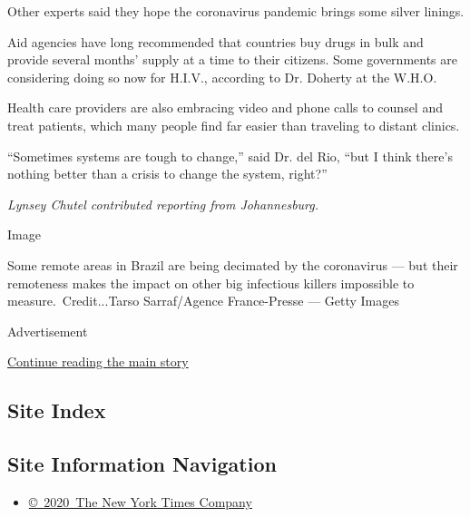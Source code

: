 Other experts said they hope the coronavirus pandemic brings some silver
linings.

Aid agencies have long recommended that countries buy drugs in bulk and
provide several months' supply at a time to their citizens. Some
governments are considering doing so now for H.I.V., according to Dr.
Doherty at the W.H.O.

Health care providers are also embracing video and phone calls to
counsel and treat patients, which many people find far easier than
traveling to distant clinics.

``Sometimes systems are tough to change,'' said Dr. del Rio, ``but I
think there's nothing better than a crisis to change the system,
right?''

\emph{Lynsey Chutel contributed reporting from Johannesburg.}

Image

Some remote areas in Brazil are being decimated by the coronavirus ---
but their remoteness makes the impact on other big infectious killers
impossible to measure.~Credit...Tarso Sarraf/Agence France-Presse ---
Getty Images

Advertisement

\protect\hyperlink{after-bottom}{Continue reading the main story}

\hypertarget{site-index}{%
\subsection{Site Index}\label{site-index}}

\hypertarget{site-information-navigation}{%
\subsection{Site Information
Navigation}\label{site-information-navigation}}

\begin{itemize}
\tightlist
\item
  \href{https://help.nytimes.com/hc/en-us/articles/115014792127-Copyright-notice}{©~2020~The
  New York Times Company}
\end{itemize}

